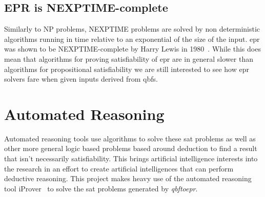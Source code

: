 \subsection{EPR is NEXPTIME-complete}
Similarly to NP problems, NEXPTIME problems are solved by non deterministic algorithms running in time relative to an exponential of the size of the input. \Gls{epr} was shown to be NEXPTIME-complete by Harry Lewis in 1980~\cite{harrylewis}. While this does mean that algorithms for proving satisfiability of \gls{epr} are in general slower than algorithms for propositional satisfiability we are still interested to see how \gls{epr} solvers fare when given inputs derived from \glspl{qbf}.

\section{Automated Reasoning}
Automated reasoning tools use algorithms to solve these \gls{sat} problems as well as other more general logic based problems based around deduction to find a result that isn't necessarily satisfiability. This brings artificial intelligence interests into the research in an effort to create artificial intelligences that can perform deductive reasoning. This project makes heavy use of the automated reasoning tool iProver~\cite{iprover} to solve the \gls{sat} problems generated by \textit{qbftoepr}.
